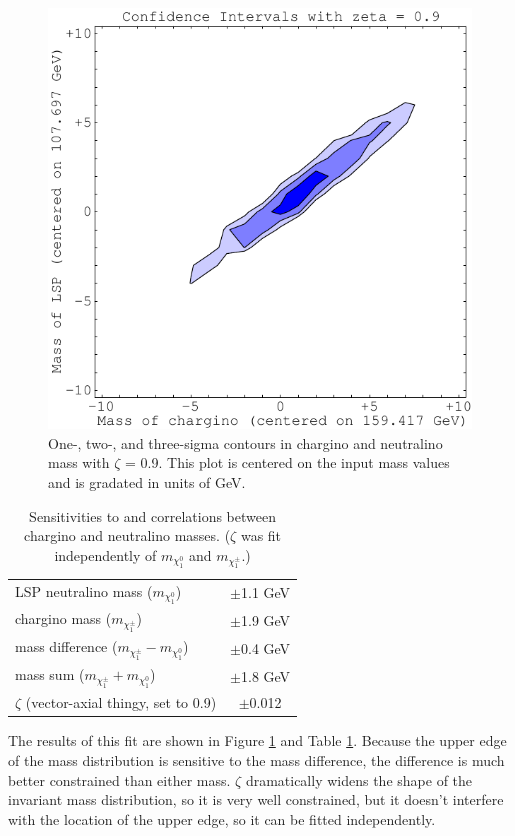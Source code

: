\documentclass[12pt]{article}
\begin{document}
\begin{figure}[p]
  \begin{center}
    \includegraphics[width=0.7\linewidth]{fake3_contours}
  \end{center}

  \caption{One-, two-, and three-sigma contours in chargino and
    neutralino mass with $\zeta$ = 0.9.  This plot is centered on the
    input mass values and is gradated in units of
    GeV. \label{jimp_contours}}
\end{figure}

\begin{table}[p]
  \begin{center}
    \begin{tabular}{l c}
      LSP neutralino mass ($m_{\chi_1^0}$) & $\pm$1.1 GeV \\
      chargino mass ($m_{\chi_1^\pm}$) & $\pm$1.9 GeV \\
      mass difference ($m_{\chi_1^\pm} - m_{\chi_1^0}$) & $\pm$0.4 GeV \\
      mass sum ($m_{\chi_1^\pm} + m_{\chi_1^0}$) & $\pm$1.8 GeV \\
      $\zeta$ (vector-axial thingy, set to 0.9) & $\pm$0.012 \\
    \end{tabular}
  \end{center}

  \caption{Sensitivities to and correlations between chargino and
      neutralino masses.  ($\zeta$ was fit independently of
      $m_{\chi_1^0}$ and $m_{\chi_1^\pm}$.) \label{jimp_errors}}
\end{table}

The results of this fit are shown in Figure \ref{jimp_contours} and
Table \ref{jimp_errors}.  Because the upper edge of the mass
distribution is sensitive to the mass difference, the difference is
much better constrained than either mass.  $\zeta$ dramatically widens
the shape of the invariant mass distribution, so it is very well
constrained, but it doesn't interfere with the location of the upper
edge, so it can be fitted independently.
\end{document}
